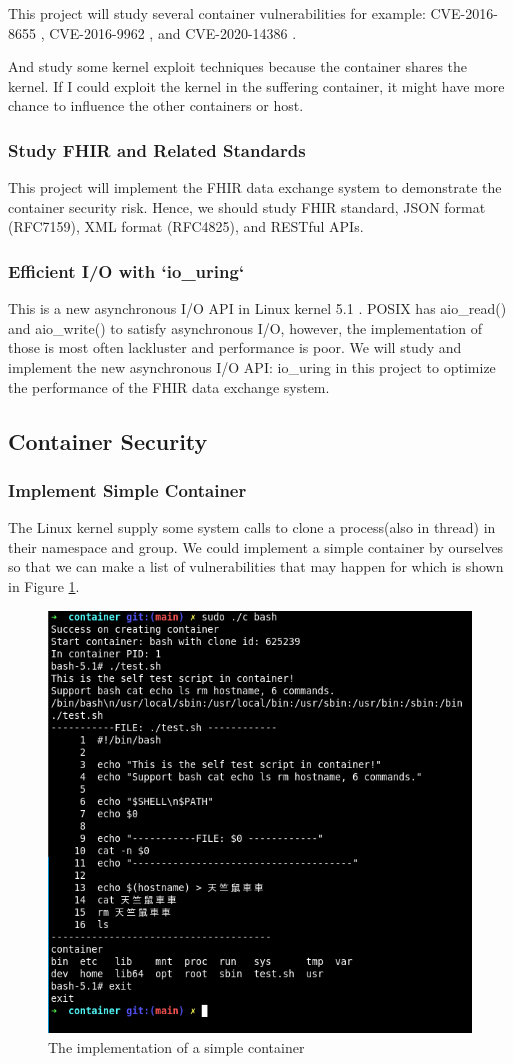 \documentclass[12pt,a4paper]{article}
\begin{document}
This project will study several container vulnerabilities for example: CVE-2016-8655
\cite{CVE-2016-8655}, CVE-2016-9962 \cite{CVE-2016-9962}, and CVE-2020-14386 \cite{CVE-2020-14386}.

And study some kernel exploit techniques \cite{Kernel_exploitation} because the container shares
the kernel. If I could exploit the kernel in the suffering container, it might have more chance
to influence the other containers or host.

\subsubsection{Study FHIR and Related Standards}
This project will implement the FHIR \cite{FHIR_home} data exchange system to demonstrate the container
security risk. Hence, we should study FHIR standard, JSON format (RFC7159), XML format (RFC4825), and
RESTful APIs.

\subsubsection{Efficient I/O with `io\_uring`}
This is a new asynchronous I/O API in Linux kernel 5.1 \cite{Efficient_IO_uring}. POSIX has
aio\_read() and aio\_write() to satisfy asynchronous I/O, however, the implementation of those
is most often lackluster and performance is poor. We will study and implement the new asynchronous
I/O API: io\_uring in this project to optimize the performance of the FHIR data exchange system.

\subsection{Container Security}
\subsubsection{Implement Simple Container}
The Linux kernel supply some system calls to clone a process(also in thread) in their namespace
and group. We could implement a simple container by ourselves so that we can make a list of
vulnerabilities that may happen for which is shown in Figure \ref*{Fig:sc}.

\begin{figure}
  \includegraphics[width=.5\textwidth]{Screenshot from 2021-02-09 19-45-29.png}
  \caption{The implementation of a simple container}
  \label{Fig:sc}
\end{figure}
\end{document}
